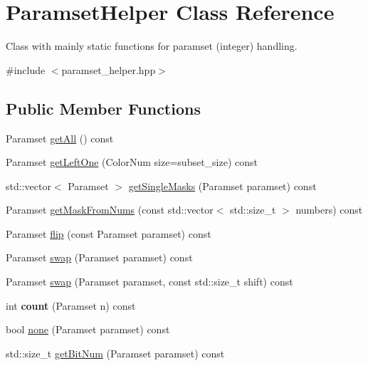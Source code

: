 \hypertarget{classParamsetHelper}{\section{\-Paramset\-Helper \-Class \-Reference}
\label{classParamsetHelper}
}


\-Class with mainly static functions for paramset (integer) handling.  




{\ttfamily \#include $<$paramset\-\_\-helper.\-hpp$>$}

\subsection*{\-Public \-Member \-Functions}
\begin{DoxyCompactItemize}
\item 
\-Paramset \hyperlink{classParamsetHelper_a010055896af6c124ead5d11f1c2851c7}{get\-All} () const 
\item 
\-Paramset \hyperlink{classParamsetHelper_a99f891518869f38c9ff5908cc3ed5283}{get\-Left\-One} (\-Color\-Num size=subset\-\_\-size) const 
\item 
std\-::vector$<$ \-Paramset $>$ \hyperlink{classParamsetHelper_a8e0b9b9b7c8088914309e865b3e2e124}{get\-Single\-Masks} (\-Paramset paramset) const 
\item 
\-Paramset \hyperlink{classParamsetHelper_aa00795ab1553c4ff7106288d19408db0}{get\-Mask\-From\-Nums} (const std\-::vector$<$ std\-::size\-\_\-t $>$ numbers) const 
\item 
\-Paramset \hyperlink{classParamsetHelper_a940010e8e14c8b42eff4640fb0c266fc}{flip} (const \-Paramset paramset) const 
\item 
\-Paramset \hyperlink{classParamsetHelper_a30f94e07f525b40f3a5704db0437b9f2}{swap} (\-Paramset paramset) const 
\item 
\-Paramset \hyperlink{classParamsetHelper_acde946486f795eda8b30aca6ab13039a}{swap} (\-Paramset paramset, const std\-::size\-\_\-t shift) const 
\item 
\hypertarget{classParamsetHelper_a84c5e76dc7b3dbbc183f97ecfe0cb472}{int {\bfseries count} (\-Paramset n) const }\label{classParamsetHelper_a84c5e76dc7b3dbbc183f97ecfe0cb472}

\item 
bool \hyperlink{classParamsetHelper_ae7c850c7f85580a73a5289ca85bf3862}{none} (\-Paramset paramset) const 
\item 
std\-::size\-\_\-t \hyperlink{classParamsetHelper_a3afd9e88dc04b9a770e0fbe9f83307a4}{get\-Bit\-Num} (\-Paramset paramset) const 
\end{DoxyCompactItemize}

